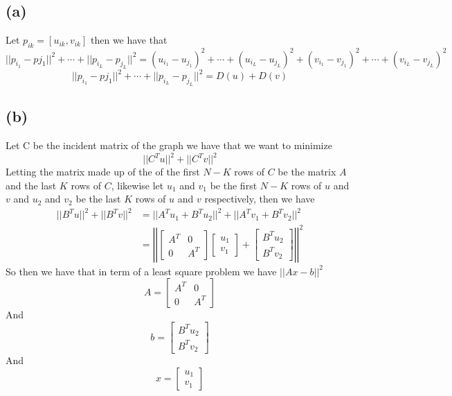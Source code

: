 \subsection*{(a)}
Let $p_{ik}=[u_{ik},v_{ik}]$ then we have that 
$$||p_{i_{1}}-p{j_{1}}||^2+\cdots+||p_{i_{L}}-p_{j_{L}}||^2=(u_{i_{1}}-u_{j_{1}})^2+\cdots+(u_{i_{L}}-u_{j_{L}})^2+(v_{i_{1}}-v_{j_{1}})^2+\cdots+(v_{i_{L}}-v_{j_{L}})^2$$
$$||p_{i_{1}}-p{j_{1}}||^2+\cdots+||p_{i_{L}}-p_{j_{L}}||^2=D(u)+D(v)$$
\subsection*{(b)}
Let C be the incident matrix of the graph we have that we want to minimize
$$||C^Tu||^2+||C^Tv||^2$$
Letting the matrix made up of the of the first $N-K$ rows of $C$
be the matrix $A$ and the last $K$ rows of $C$, likewise let
$u_{1}$ and $v_{1}$ be the first $N-K$ rows of $u$ and $v$ and
$u_{2}$ and $v_{2}$ be the last $K$ rows of $u$ and $v$ respectively, then we have
\begin{align*}
||B^Tu||^2+||B^Tv||^2&=||A^Tu_{1}+B^Tu_{2}||^2+||A^Tv_{1}+B^Tv_{2}||^2\\
&=\left|\left|\begin{bmatrix}
    A^T & 0\\
    0 & A^T
\end{bmatrix}\begin{bmatrix}
    u_{1}\\
    v_{1}
\end{bmatrix}+\begin{bmatrix}
    B^Tu_{2}\\
    B^Tv_{2}
\end{bmatrix}\right|\right|^2
\end{align*}
So then we have that in term of a least square problem we have
$||Ax-b||^2$
$$A=\begin{bmatrix}
    A^T & 0\\
    0 & A^T
\end{bmatrix}$$
And
$$b=\begin{bmatrix}
    B^Tu_{2}\\
    B^Tv_{2}
\end{bmatrix}$$
And
$$x=\begin{bmatrix}
    u_{1}\\
    v_{1}
\end{bmatrix}$$
